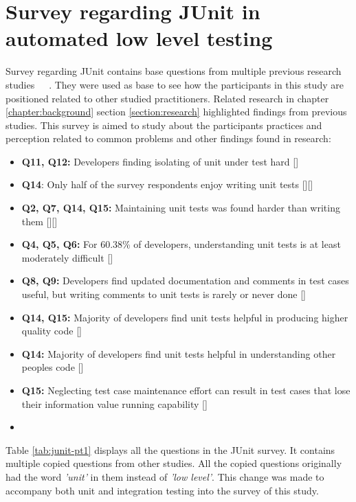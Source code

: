 \section{Survey regarding JUnit in automated low level testing}
Survey regarding JUnit contains base questions from multiple previous research studies~\cite{williams2009effectiveness}~\cite{daka2014survey}~\cite{li2016automatically}.
They were used as base to see how the participants in this study are positioned related to other studied practitioners.
Related research in chapter \ref{chapter:background} section \ref{section:research} highlighted findings from previous studies.
This survey is aimed to study about the participants practices and perception related to common problems and other findings found in research:
\begin{itemize}
    \item \textbf{Q11, Q12:} Developers finding isolating of unit under test hard []
    \item \textbf{Q14}: Only half of the survey respondents enjoy writing unit tests [][]
    \item \textbf{Q2, Q7, Q14, Q15: }Maintaining unit tests was found harder than writing them [][]
    \item \textbf{Q4, Q5, Q6:} For 60.38\% of developers, understanding unit tests is at least moderately difficult []
    \item \textbf{Q8, Q9:} Developers find updated documentation and comments in test cases useful, but writing comments to unit tests is rarely or never done []
    \item \textbf{Q14, Q15:} Majority of developers find unit tests helpful in producing higher quality code []
    \item \textbf{Q14:} Majority of developers find unit tests helpful in understanding other peoples code []
    \item \textbf{Q15:} Neglecting test case maintenance effort can result in test cases that lose their information value running capability []
    \item
\end{itemize}

Table \ref{tab:junit-pt1} displays all the questions in the JUnit survey. It contains multiple copied questions from other
studies. All the copied questions originally had the word \textit{'unit'} in them instead of \textit{'low level'}. This change
was made to accompany both unit and integration testing into the survey of this study.

